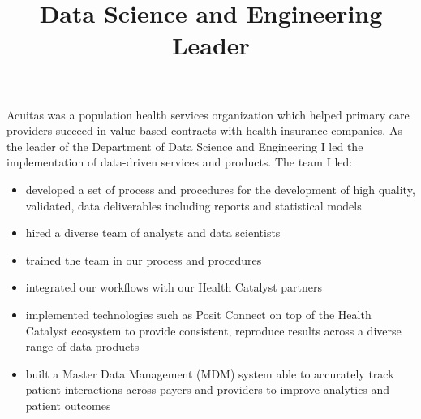 \documentclass[line, mm, 10pt]{res}
\begin{document}
\begin{resume}
    


  \title{Data Science and Engineering Leader}
  \begin{position}
    Acuitas was a population health services organization which helped primary
    care providers succeed in value based contracts with health insurance
    companies. As the leader of the Department of Data Science and Engineering I
    led the implementation of data-driven services and products. The team I led:
    
    \begin{itemize}
      \item developed a set of process and procedures for the development of
      high quality, validated, data deliverables including reports and
      statistical models
      \item hired a diverse team of analysts and data scientists
      \item trained the team in our process and procedures
      \item integrated our workflows with our Health Catalyst partners
      \item implemented technologies such as Posit Connect on top of the Health
      Catalyst ecosystem to provide consistent, reproduce results across a
      diverse range of data products
      \item built a Master Data Management (MDM) system able to accurately track patient interactions across payers and providers to improve analytics and patient outcomes
    \end{itemize}


\end{position}
\end{resume}
\end{document}
